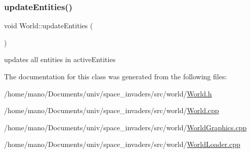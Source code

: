\subsubsection{\texorpdfstring{update\+Entities()}{updateEntities()}}
{\footnotesize\ttfamily void World\+::update\+Entities (\begin{DoxyParamCaption}{ }\end{DoxyParamCaption})}

updates all entities in active\+Entities 

The documentation for this class was generated from the following files\+:\begin{DoxyCompactItemize}
\item 
/home/mano/\+Documents/univ/space\+\_\+invaders/src/world/\hyperlink{World_8h}{World.\+h}\item 
/home/mano/\+Documents/univ/space\+\_\+invaders/src/world/\hyperlink{World_8cpp}{World.\+cpp}\item 
/home/mano/\+Documents/univ/space\+\_\+invaders/src/world/\hyperlink{WorldGraphics_8cpp}{World\+Graphics.\+cpp}\item 
/home/mano/\+Documents/univ/space\+\_\+invaders/src/world/\hyperlink{WorldLoader_8cpp}{World\+Loader.\+cpp}\end{DoxyCompactItemize}
